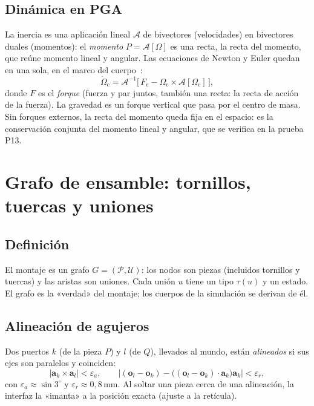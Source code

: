 \documentclass[11pt,a4paper]{article}
\numberwithin{equation}{section}
\newcommand{\vect}[1]{\bm{#1}}
\begin{document}
\subsection{Dinámica en PGA}
La inercia es una aplicación lineal $\mathcal{A}$ de bivectores (velocidades) en bivectores duales (momentos): el
\emph{momento} $P = \mathcal{A}[\Omega]$ es una recta, la recta del momento, que reúne momento lineal y angular. Las
ecuaciones de Newton y Euler quedan en una sola, en el marco del cuerpo~\cite{dorst-dekeninck, gunn-tesis}:
\begin{equation}
  \dot\Omega_{\text{c}} = \mathcal{A}^{-1}\!\bigl[\,F_{\text{c}} - \Omega_{\text{c}}\times\mathcal{A}[\Omega_{\text{c}}]\,\bigr],
\end{equation}
donde $F$ es el \emph{forque} (fuerza y par juntos, también una recta: la recta de acción de la fuerza). La gravedad es
un forque vertical que pasa por el centro de masa. Sin forques externos, la recta del momento queda fija en el espacio:
es la conservación conjunta del momento lineal y angular, que se verifica en la prueba P13.

\section{Grafo de ensamble: tornillos, tuercas y uniones}\label{sec:ensamble}

\subsection{Definición}
El montaje es un grafo $G = (\mathcal{P}, \mathcal{U})$: los nodos son piezas (incluidos tornillos y tuercas) y las
aristas son uniones. Cada unión $u$ tiene un tipo $\tau(u)$ y un estado. El grafo es la «verdad» del montaje; los
cuerpos de la simulación se derivan de él.

\subsection{Alineación de agujeros}
Dos puertos $k$ (de la pieza $P$) y $l$ (de $Q$), llevados al mundo, están \emph{alineados} si sus ejes son paralelos y
coinciden:
\begin{equation}
  \lvert \vect{a}_k \times \vect{a}_l \rvert < \varepsilon_a, \qquad
  \bigl\lvert (\vect{o}_l - \vect{o}_k) - \bigl((\vect{o}_l-\vect{o}_k)\cdot\vect{a}_k\bigr)\vect{a}_k \bigr\rvert < \varepsilon_r,
\end{equation}
con $\varepsilon_a \approx \sin 3^\circ$ y $\varepsilon_r \approx 0{,}8$\,mm. Al soltar una pieza cerca de una
alineación, la interfaz la «imanta» a la posición exacta (ajuste a la retícula).
\end{document}

